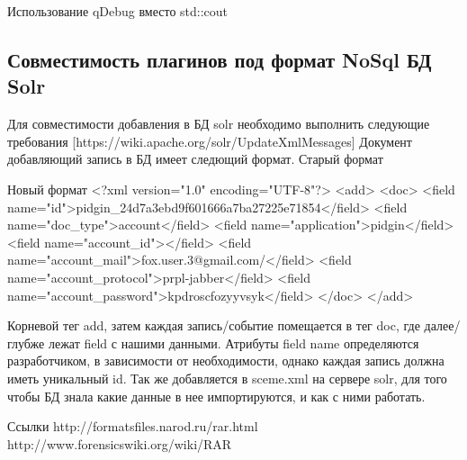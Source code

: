 Использование qDebug вместо std::cout

\subsection{Совместимость плагинов под формат NoSql БД Solr}

Для совместимости добавления в БД solr необходимо выполнить следующие требования
[https://wiki.apache.org/solr/UpdateXmlMessages]
Документ добавляющий запись в БД имеет следющий формат. 
Старый формат


Новый формат
<?xml version="1.0" encoding="UTF-8"?>
<add>
    <doc>
        <field name="id">pidgin_24d7a3ebd9f601666a7ba27225e71854</field>
        <field name="doc_type">account</field>
        <field name="application">pidgin</field>
        <field name="account_id"></field>
        <field name="account_mail">fox.user.3@gmail.com/</field>
        <field name="account_protocol">prpl-jabber</field>
        <field name="account_password">kpdroscfozyyvsyk</field>
    </doc>
</add>

Корневой тег add,  затем каждая запись/событие помещается в тег doc, где далее/глубже лежат field с нашими  данными. Атрибуты field name определяются разработчиком, в зависимости от необходимости, однако каждая запись должна иметь уникальный id. Так же добавляется в sceme.xml  на сервере solr, для того чтобы БД знала какие данные в нее импортируются, и как с ними работать.

Ссылки
http://formatsfiles.narod.ru/rar.html
http://www.forensicswiki.org/wiki/RAR
